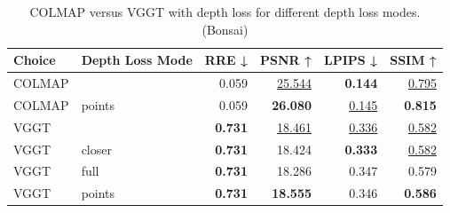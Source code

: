 \begin{table}[H]
\caption{\ifdefined\customcaption \customcaption \else COLMAP versus VGGT with depth loss for different depth loss modes. (Bonsai) \fi}
\label{tab:05_depth_loss_mode_bonsai}
\centering
\scriptsize
\begin{tabular}{llrrrr}
\toprule
Choice & Depth Loss Mode & RRE ↓ & PSNR ↑ & LPIPS ↓ & SSIM ↑ \\
\midrule
COLMAP &  & 0.059 & \underline{25.544} & \textbf{0.144} & \underline{0.795} \\
COLMAP & points & 0.059 & \textbf{26.080} & \underline{0.145} & \textbf{0.815} \\
\midrule
VGGT &  & \textbf{0.731} & \underline{18.461} & \underline{0.336} & \underline{0.582} \\
VGGT & closer & \textbf{0.731} & 18.424 & \textbf{0.333} & \underline{0.582} \\
VGGT & full & \textbf{0.731} & 18.286 & 0.347 & 0.579 \\
VGGT & points & \textbf{0.731} & \textbf{18.555} & 0.346 & \textbf{0.586} \\
\bottomrule
\end{tabular}
\end{table}